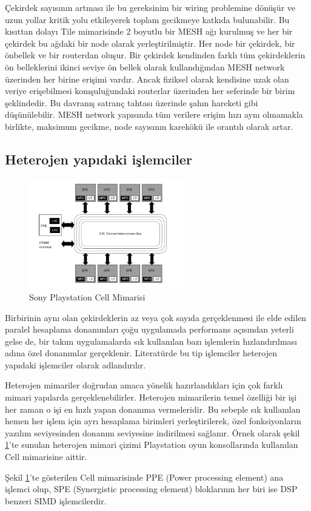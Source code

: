 Çekirdek sayısının artması ile bu gereksinim bir wiring problemine dönüşür ve uzun yollar kritik yolu etkileyerek toplam gecikmeye katkıda bulunabilir. Bu kısıttan dolayı Tile mimarisinde 2 boyutlu bir MESH ağı kurulmuş ve her bir çekirdek bu ağdaki bir node olarak yerleştirilmiştir. Her node bir çekirdek, bir önbellek ve bir routerdan oluşur. Bir çekirdek kendinden farklı tüm çekirdeklerin ön belleklerini ikinci seviye ön bellek olarak kullandığından MESH network üzerinden her birine erişimi vardır. Ancak fiziksel olarak kendisine uzak olan veriye erişebilmesi komşuluğundaki routerlar üzerinden her seferinde bir birim şeklindedir. Bu davranış satranç tahtası üzerinde şahın hareketi gibi düşünülebilir. MESH network yapısında tüm verilere erişim hızı aynı olmamakla birlikte, maksimum gecikme, node sayısının karekökü ile orantılı olarak artar. 



\subsection{Heterojen yapıdaki işlemciler}
\begin{figure}
\centering
\shorthandoff{=}
\includegraphics[width=0.6\textwidth]{gorsel/playStationArchitecture.png}
\shorthandoff{=}
\caption{Sony Playstation Cell Mimarisi}
\label{image:playStationArchitecture}
\end{figure}

Birbirinin aynı olan çekirdeklerin az veya çok sayıda gerçeklenmesi ile elde edilen paralel hesaplama donanımları çoğu uygulamada performans açısından yeterli gelse de, bir takım uygulamalarda sık kullanılan bazı işlemlerin hızlandırılması adına özel donanımlar gerçeklenir. Literatürde bu tip işlemciler heterojen yapıdaki işlemciler olarak adlandırılır.\par 

Heterojen mimariler doğrudan amaca yönelik hazırlandıkları için çok farklı mimari yapılarda gerçeklenebilirler. Heterojen mimarilerin temel özelliği bir işi her zaman o işi en hızlı yapan donanıma vermeleridir. Bu sebeple sık kullanılan hemen her işlem için ayrı hesaplama birimleri yerleştirilerek, özel fonksiyonların yazılım seviyesinden donanım seviyesine indirilmesi sağlanır. Örnek olarak şekil \ref{image:playStationArchitecture}'te sunulan heterojen mimari çizimi Playstation oyun konsollarında kullanılan Cell mimarisine aittir. \par

Şekil \ref{image:playStationArchitecture}'te gösterilen Cell mimarisinde PPE (Power processing element) ana işlemci olup, SPE (Synergistic processing element) bloklarının her biri ise DSP benzeri SIMD işlemcilerdir.
